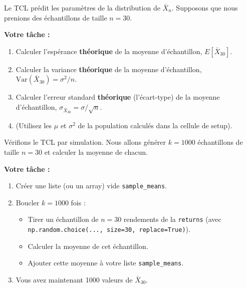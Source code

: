 \begin{exercicebox}
Le TCL prédit les paramètres de la distribution de $\bar{X}_n$.
Supposons que nous prenions des échantillons de taille $n=30$.

\textbf{Votre tâche :}
\begin{enumerate}
    \item Calculer l'espérance \textbf{théorique} de la moyenne d'échantillon, $E[\bar{X}_{30}]$.
    \item Calculer la variance \textbf{théorique} de la moyenne d'échantillon, $\text{Var}(\bar{X}_{30}) = \sigma^2 / n$.
    \item Calculer l'erreur standard \textbf{théorique} (l'écart-type) de la moyenne d'échantillon, $\sigma_{\bar{X}_{30}} = \sigma / \sqrt{n}$.
    \item (Utilisez les $\mu$ et $\sigma^2$ de la population calculés dans la cellule de setup).
\end{enumerate}
\end{exercicebox}

\begin{exercicebox}
Vérifions le TCL par simulation. Nous allons générer $k=1000$ échantillons de taille $n=30$ et calculer la moyenne de chacun.

\textbf{Votre tâche :}
\begin{enumerate}
    \item Créer une liste (ou un array) vide \texttt{sample\_means}.
    \item Boucler $k=1000$ fois :
        \begin{itemize}
            \item Tirer un échantillon de $n=30$ rendements de la \texttt{returns} (avec \texttt{np.random.choice(..., size=30, replace=True)}).
            \item Calculer la moyenne de cet échantillon.
            \item Ajouter cette moyenne à votre liste \texttt{sample\_means}.
        \end{itemize}
    \item Vous avez maintenant 1000 valeurs de $\bar{X}_{30}$.
\end{enumerate}
\end{exercicebox}

